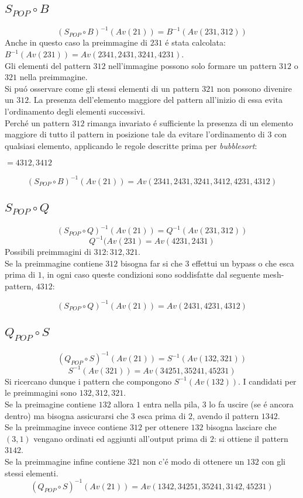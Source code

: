 \subsection*{$S_{POP}\circ{B}$}$$(S_{POP}\circ{B})^{-1}(Av(21))=B^{-1}(Av(231,312))$$
Anche in questo caso la preimmagine di $231$ \'e stata calcolata: $B^{-1}(Av(231))= Av(2341, 2431, 3241, 4231)$.\\
Gli elementi del pattern $312$ nell'immagine possono solo formare un pattern $312$ o $321$ nella preimmagine.\\
Si pu\'o osservare come gli stessi elementi di un pattern $321$ non possono divenire un $312$. La presenza dell'elemento maggiore del pattern all'inizio di essa evita l'ordinamento degli elementi successivi.\\
Perch\'e un pattern $312$ rimanga invariato \'e sufficiente la presenza di un elemento maggiore di tutto il pattern in posizione tale da evitare l'ordinamento di $3$ con qualsiasi elemento, applicando le regole descritte prima per \textit{bubblesort}: 
\begin{center}
$=4312,3412$
\end{center}
$$(S_{POP}\circ{B})^{-1}(Av(21))=Av(2341, 2431, 3241, 3412, 4231, 4312)$$
\subsection*{$S_{POP}\circ{Q}$}$$(S_{POP}\circ{Q})^{-1}(Av(21))=Q^{-1}(Av(231,312))$$$$Q^{-1}(Av(231)=Av(4231,2431)$$
Possibili preimmagini di $312: 312, 321$.\\
Se la preimmagine contiene $312$ bisogna far si che $3$ effettui un bypass o che esca prima di $1$, in ogni caso queste condizioni sono soddisfatte dal seguente mesh-pattern, $4312$:
\begin{center}
\end{center}
$$(S_{POP}\circ{Q})^{-1}(Av(21))=Av(2431,4231,4312)$$
\subsection*{$Q_{POP}\circ{S}$}$$(Q_{POP}\circ{S})^{-1}(Av(21))=S^{-1}(Av(132,321))$$$$S^{-1}(Av(321))=Av(34251, 35241, 45231)$$
Si ricercano dunque i pattern che compongono $S^{-1}(Av(132))$. I candidati per le preimmagini sono $132,312,321$.\\
Se la preimagine contiene $132$ allora $1$ entra nella pila, $3$ lo fa uscire (se \'e ancora dentro) ma bisogna assicurarsi che $3$ esca prima di $2$, avendo il pattern $1342$.\\
Se la preimmagine invece contiene $312$ per ottenere $132$ bisogna lasciare che $(3,1)$ vengano ordinati ed aggiunti all'output prima di $2$: si ottiene il pattern $3142$.\\
Se la preimmagine infine contiene $321$ non c'\'e modo di ottenere un $132$ con gli stessi elementi.
$$(Q_{POP}\circ{S})^{-1}(Av(21))=Av(1342, 34251, 35241, 3142, 45231)$$
